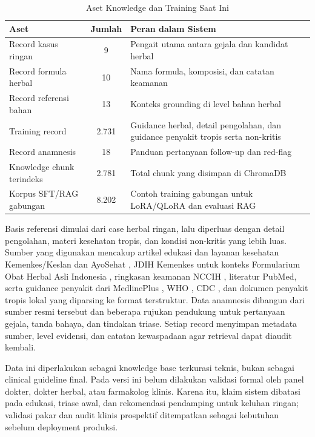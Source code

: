 \documentclass[conference]{IEEEtran}
\begin{document}
\begin{table}[t]
\caption{Aset Knowledge dan Training Saat Ini}
\label{tab:data_assets_id}
\centering
\footnotesize
\setlength{\tabcolsep}{3pt}
\begin{tabular}{|p{2.05cm}|c|p{3.15cm}|}
\hline
\textbf{Aset} & \textbf{Jumlah} & \textbf{Peran dalam Sistem} \\
\hline
Record kasus ringan & 9 & Pengait utama antara gejala dan kandidat herbal \\
\hline
Record formula herbal & 10 & Nama formula, komposisi, dan catatan keamanan \\
\hline
Record referensi bahan & 13 & Konteks grounding di level bahan herbal \\
\hline
Training record & 2.731 & Guidance herbal, detail pengolahan, dan guidance penyakit tropis serta non-kritis \\
\hline
Record anamnesis & 18 & Panduan pertanyaan follow-up dan red-flag \\
\hline
Knowledge chunk terindeks & 2.781 & Total chunk yang disimpan di ChromaDB \\
\hline
Korpus SFT/RAG gabungan & 8.202 & Contoh training gabungan untuk LoRA/QLoRA dan evaluasi RAG \\
\hline
\end{tabular}
\end{table}

Basis referensi dimulai dari case herbal ringan, lalu diperluas dengan detail pengolahan, materi kesehatan tropis, dan kondisi non-kritis yang lebih luas. Sumber yang digunakan mencakup artikel edukasi dan layanan kesehatan Kemenkes/Keslan dan AyoSehat \cite{b14}, JDIH Kemenkes untuk konteks Formularium Obat Herbal Asli Indonesia \cite{b15}, ringkasan keamanan NCCIH \cite{b16}, literatur PubMed, serta guidance penyakit dari MedlinePlus \cite{b17}, WHO \cite{b18}, CDC \cite{b19}, dan dokumen penyakit tropis lokal yang diparsing ke format terstruktur. Data anamnesis dibangun dari sumber resmi tersebut dan beberapa rujukan pendukung untuk pertanyaan gejala, tanda bahaya, dan tindakan triase. Setiap record menyimpan metadata sumber, level evidensi, dan catatan kewaspadaan agar retrieval dapat diaudit kembali.

Data ini diperlakukan sebagai knowledge base terkurasi teknis, bukan sebagai clinical guideline final. Pada versi ini belum dilakukan validasi formal oleh panel dokter, dokter herbal, atau farmakolog klinis. Karena itu, klaim sistem dibatasi pada edukasi, triase awal, dan rekomendasi pendamping untuk keluhan ringan; validasi pakar dan audit klinis prospektif ditempatkan sebagai kebutuhan sebelum deployment produksi.
\end{document}
